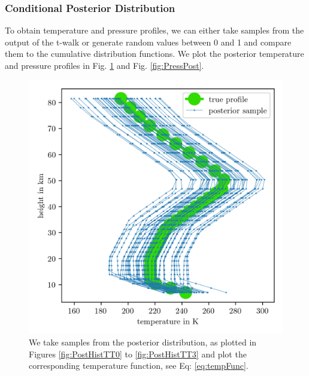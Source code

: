 \clearpage





\subsubsection{Conditional Posterior Distribution}
To obtain temperature and pressure profiles, we can either take samples from the output of the t-walk or generate random values between 0 and 1 and compare them to the cumulative distribution functions.
We plot the posterior temperature and pressure profiles in Fig. \ref{fig:TempPost} and Fig. \ref{fig:PressPost}.
\begin{figure}[ht!]
	\centering
	\includegraphics{TempPostMeanSigm.png} 
	\caption[Temperature posterior samples.]{We take samples from the posterior distribution, as plotted in Figures \ref{fig:PostHistTT0} to \ref{fig:PostHistTT3} and plot the corresponding temperature function, see Eq: \ref{eq:tempFunc}. }
	\label{fig:TempPost}
\end{figure}
\cleardoublepage
